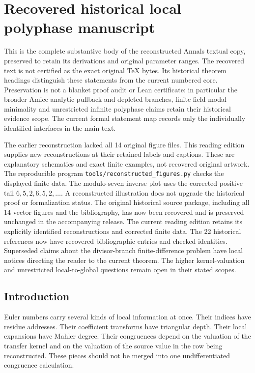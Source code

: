 \clearpage\section{Recovered historical local polyphase manuscript}\label{app:recovered}
This is the complete substantive body of the reconstructed Annals textual
copy, preserved to retain its derivations and original parameter ranges.
The recovered text is not certified as the exact original TeX bytes. Its
historical theorem headings distinguish these statements from the current
numbered core. Preservation is not a blanket proof audit or Lean certificate:
in particular the broader Amice analytic pullback and depleted branches,
finite-field modal minimality and unrestricted infinite polyphase claims
retain their historical evidence scope. The current formal statement map
records only the individually identified interfaces in the main text.

The earlier reconstruction lacked all 14 original figure files. This
reading edition supplies new reconstructions at their retained labels and
captions. These are explanatory schematics and exact finite examples, not
recovered original artwork. The reproducible program
\nolinkurl{tools/reconstructed_figures.py} checks the displayed finite data.
The modulo-seven inverse plot uses the corrected positive tail
$6,5,2,6,5,2,\ldots$. A reconstructed illustration does not upgrade the
historical proof or formalization status. The original historical source
package, including all 14 vector figures and the bibliography, has now been
recovered and is preserved unchanged in the accompanying release. The current
reading edition retains its explicitly identified reconstructions and corrected
finite data. The 22 historical references now have recovered bibliographic
entries and checked identities. Superseded claims about the divisor-branch
finite-difference problem have local notices directing the reader to the
current theorem. The higher kernel-valuation and unrestricted
local-to-global questions remain open in their stated scopes.

\subsection{Introduction}\label{hist:sec:introduction}

Euler numbers carry several kinds of local information at once. Their indices have residue addresses. Their coefficient transforms have triangular depth. Their local expansions have Mahler degree. Their congruences depend on the valuation of the transfer kernel and on the valuation of the source value in the row being reconstructed. These pieces should not be merged into one undifferentiated congruence calculation.

